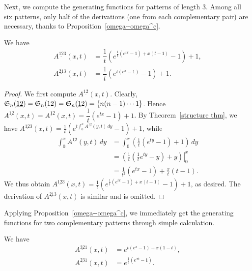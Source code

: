 

Next, we compute the generating functions for patterns of length 3. Among all six patterns, only half of the derivations (one from each complementary pair) are necessary, thanks to Proposition~\ref{omega--omega^c}.

\begin{theorem} \label{thm:12-3 and 21-3}
    We have
    \begin{align*}
    A^{\underline{12}3}(x,t) &= \dfrac{1}{t} (e^{\frac{1}{t}(e^{tx}-1)+x(t-1)}-1)+1,\\
    A^{\underline{21}3}(x,t) &= \dfrac{1}{t} (e^{t(e^x-1)}-1)+1.
    \end{align*}
\end{theorem}

\begin{proof}
    We first compute $A^{\underline{12}}(x,t)$. Clearly, $\S_n(\underline{12})=\S_n(12)=\S_n(\underline{1}2)=\{n(n-1)\cdots 1\}$. Hence $A^{\underline{12}}(x,t)=A^{\underline{1}2}(x,t)=\dfrac{1}{t}(e^{tx}-1)+1$.
    By Theorem~\ref{structure thm}, we have 
    $\displaystyle{A^{\underline{12}3}(x,t)=\frac{1}{t} (e^{t \int_{0}^{x} A^{\underline{12}}(y,t) \,dy}-1) +1 }$, while 
    \begin{align*}
        \int_{0}^{x} A^{\underline{12}}(y,t) \,dy &=\int_{0}^{x} \left(\frac{1}{t}(e^{ty}-1)+1\right)\,dy \\
        &= \left. \left(\frac{1}{t}(\frac{1}{t} e^{ty}-y)+y\right) \right|_{0}^{x} \\
        &= \frac{1}{t^2}(e^{tx}-1)+\frac{x}{t}(t-1).
    \end{align*}
    We thus obtain $\displaystyle{A^{\underline{12}3}(x,t)=\frac{1}{t} (e^{\frac{1}{t}(e^{tx}-1)+x(t-1)}-1)+1}$, as desired. The derivation of $A^{\underline{21}3}(x,t)$ is similar and is omitted.
\end{proof}

Applying Proposition~\ref{omega--omega^c}, we immediately get the generating functions for two complementary patterns through simple calculation.

\begin{corollary} \label{cor:32-1 and 23-1}
    We have
    \begin{align*}
    A^{\underline{32}1}(x,t) &= e^{t(e^{x}-1)+x(1-t)},\\
    A^{\underline{23}1}(x,t) &= e^{\frac{1}{t}(e^{xt}-1)}.
    \end{align*}
\end{corollary}


